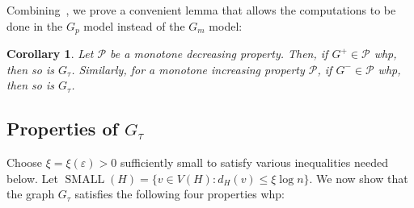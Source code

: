 \documentclass[reqno,final,a4paper]{amsart}
\numberwithin{equation}{section}
\newtheorem{corollary}[theorem]{Corollary}
\theoremstyle{definition}
\theoremstyle{remark}
\newcommand{\eps}{\varepsilon}
\newcommand{\SMA}{\operatorname{SMALL}}
\def\calP{\mathcal{P}}
\begin{document}
Combining~, we prove a convenient lemma that allows the computations to be done in the $G_p$ model instead of the $G_m$ model:
\begin{corollary}\label{cor:monotonicity}
    Let $\calP$ be a monotone decreasing property. Then, if $G^+\in \calP$ whp, then so is $G_\tau$. Similarly, for a monotone increasing property $\calP$, if $G^-\in \calP$ whp, then so is $G_\tau$.
\end{corollary}


\subsection{Properties of \texorpdfstring{$G_\tau$}{Gτ}}
Choose $\xi = \xi(\eps) >0$ sufficiently small to satisfy various inequalities needed below.
Let $\SMA(H) = \{v\in V(H): d_{H}(v)\leq \xi \log n\}$. 
We now show that the graph $G_\tau$ satisfies the following four properties whp:
\end{document}
